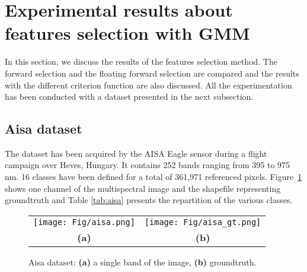 \documentclass[a4paper,11pt,DIV=16,abstracton]{scrartcl}
\begin{document}
\section{Experimental results about features selection with GMM}
\label{sec:gmm-results}

In this section, we discuss the results of the features selection method. The forward selection and the floating forward selection are compared and the results with the different criterion function are also discussed. All the experimentation has been conducted with a dataset presented in the next subsection.

    \subsection{Aisa dataset}
    \label{sec:aisa}
    The dataset has been acquired by the AISA Eagle sensor during a flight campaign over Heves, Hungary. It contains 252 bands ranging from 395 to 975 nm. 16 classes have been defined for a total of 361,971 referenced pixels. Figure~\ref{fig:aisa} shows one channel of the multispectral image and the shapefile representing groundtruth and Table \ref{tab:aisa} presents the repartition of the various classes.

    \begin{figure}[!ht]
        \centering
        \begin{tabular}{cc}
            \texttt{[image: Fig/aisa.png]} &
            \texttt{[image: Fig/aisa\_gt.png]} \\
            {\bfseries{(a)}} & {\bfseries{(b)}} \\
        \end{tabular}
        \caption{Aisa dataset: {\bfseries{(a)}} a single band of the image, {\bfseries{(b)}} groundtruth.\label{fig:aisa}}
    \end{figure}
\end{document}
